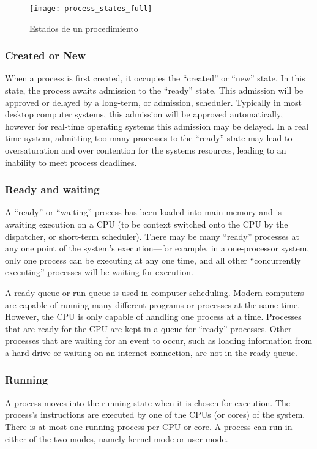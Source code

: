 \documentclass[a4paper, twoside]{article}
\begin{document}
\begin{figure}[H]
  \centering
  \texttt{[image: process\_states\_full]}
  \caption{Estados de un procedimiento}
  \label{fig:process_states_full}
\end{figure}

\subsubsection{Created or New}
When a process is first created, it occupies the ``created'' or ``new'' state.
In this state, the process awaits admission to the ``ready'' state.
This admission will be approved or delayed by a long-term, or admission,
scheduler.
Typically in most desktop computer systems, this admission will be approved
automatically, however for real-time operating systems this admission may be
delayed.
In a real time system, admitting too many processes to the ``ready'' state may
lead to oversaturation and over contention for the systems resources, leading
to an inability to meet process deadlines.

\subsubsection{Ready and waiting}

A ``ready'' or ``waiting'' process has been loaded into main memory and is
awaiting execution on a CPU (to be context switched onto the CPU by the
dispatcher, or short-term scheduler).
There may be many ``ready'' processes at any one point of the system's
execution—for example, in a one-processor system, only one process can be
executing at any one time, and all other ``concurrently executing'' processes
will be waiting for execution.

A ready queue or run queue is used in computer scheduling.
Modern computers are capable of running many different programs or processes at
the same time.
However, the CPU is only capable of handling one process at a time.
Processes that are ready for the CPU are kept in a queue for ``ready''
processes.
Other processes that are waiting for an event to occur, such as loading
information from a hard drive or waiting on an internet connection,
are not in the ready queue.

\subsubsection{Running}

A process moves into the running state when it is chosen for execution.
The process's instructions are executed by one of the CPUs (or cores) of the
system.
There is at most one running process per CPU or core.
A process can run in either of the two modes, namely kernel mode or user mode.
\end{document}
